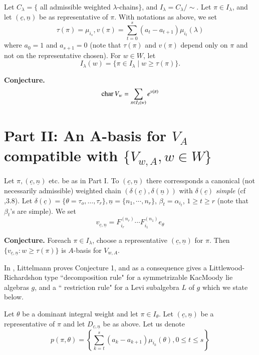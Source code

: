 Let $C_{\lambda}=\{$ all admissible weighted $\lambda$-chains$\}$, and $I_{\lambda} = C_{\lambda}/ \sim$. Let $ \pi \in I_{\lambda}$, and let $(\underline{c}, \underline{n})$ be as representative of $\pi$. With notations as above, we set
$$
\tau(\pi)= \mu_{i_{s}}, v(\pi) = \sum\limits_{t=0}^{s}(a_{t}-a_{t+1})\mu_{i_{t}}(\lambda)
$$
where $a_{0}=1$ and $ a_{s+1}=0$ (note that $\tau(\pi)$ and $ v(\pi)$ depend only on $\pi$ and not on the representative chosen). For $w \in W$, let
$$
I_{\lambda}(w) =\{\pi \in I_{\lambda} \;| \;w \geq \tau(\pi)\}.
$$

\medskip
\noindent
{\bfseries {} Conjecture.}\label{A. 5. Conjecture.}
$$
\operatorname{char} V_{w}= \sum_{\pi \in I_{\lambda}(w)} e^{v(\pi)}
$$

\newpage

\section*{Part II: An A-basis for \boldmath$V_{A}$ compatible with $\{V_{w,A}, w \in W\}$}

Let $\pi,(\underline{c}, \underline{n})$ etc. be as in Part I. To $(\underline{c}, \underline{n})$ there corressponds a canonical (not necessarily admissible) weighted chain $(\delta(\underline{c}), \delta(\underline{n}))$ with $\delta(\underline{c})$ \textit{simple} (cf \cite{chap10-keyLa},3.8). Let $\delta(\underline{c}) = \{\theta = \tau_{o}, \ldots, \tau_{r}\}, \underline{n}= \{n_{1}, \cdots, n_{r}\}$, $\beta_{t} = \alpha_{i_{t}}$, $1 \geq t \geq r$ (note that $\beta_{t}$'s are simple). We set
$$
v_{\underline{c}, \underline{n}} = F_{i_{r}}^{(n_{r})}\cdots F_{i_{1}}^{(n_{1})}e_{\theta}
$$ 

\medskip
\noindent
{\bfseries {} Conjecture.}\label{A. 6. Conjecture.} For\pageoriginale each $\pi \in I_{\lambda}$, choose a representative $(\underline{c}, \underline{n})$ for $\pi$. Then $\{v_{\underline{c}, \underline{n}}: w \geq \tau (\pi)\}$ is $A$-basis for $V_{w, A}$.

In \cite{chap10-keyLi}, Littelmann proves Conjecture 1, and as a consequence gives a Littlewood-Richardshon type ``decomposition rule" for a symmetrizable KacMoody lie algebras $g$, and a `` restriction rule" for a Levi subalgebra $L$ of $g$ which we state below.

Let $\theta$ be a dominant integral weight and let $\pi \in I_{\theta}$. Let $(\underline{c}, \underline{n})$ be a representative of $\pi$ and let $D_{\underline{c}, \underline{n}}$ be as above. Let us denote
$$
p(\pi, \theta) = \left\{\sum\limits_{k=t}^{s}(a_{k}-a_{k+1})\mu_{i_{k}}(\theta), 0 \leq t \leq s \right\}
$$

